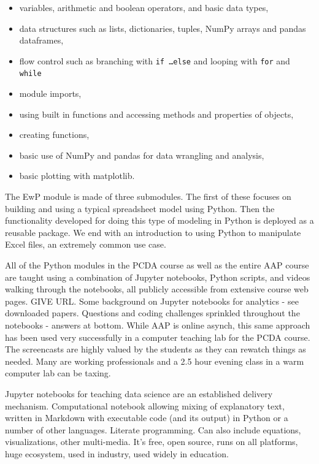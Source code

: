 \documentclass[ited,blindrev]{informs3}              %
\begin{document}
\begin{itemize}
	\item variables, arithmetic and boolean operators, and basic data types,
	\item data structures such as lists, dictionaries, tuples, NumPy arrays and pandas dataframes,
	\item flow control such as branching with \texttt{if \ldots else} and looping with \texttt{for} and \texttt{while}
	\item module imports,
	\item using built in functions and accessing methods and properties of objects,
	\item creating functions,
	\item basic use of NumPy and pandas for data wrangling and analysis,
	\item basic plotting with matplotlib.
\end{itemize}

The EwP module is made of three submodules. The first of these focuses on building and using a typical spreadsheet model using Python. Then the functionality developed for doing this type of modeling in Python is deployed as a reusable package. We end with an introduction to using Python to manipulate Excel files, an extremely common use case.

All of the Python modules in the PCDA course as well as the entire AAP course are taught using a combination of Jupyter notebooks, Python scripts, and videos walking through the notebooks, all publicly accessible from extensive course web pages. GIVE URL. Some background on Jupyter notebooks for analytics - see downloaded papers. Questions and coding challenges sprinkled throughout the notebooks - answers at bottom. While AAP is online asynch, this same approach has been used very successfully in a computer teaching lab for the PCDA course. The screencasts are highly valued by the students as they can rewatch things as needed. Many are working professionals and a 2.5 hour evening class in a warm computer lab can be taxing.

Jupyter notebooks for teaching data science are an established delivery mechanism. Computational notebook allowing mixing of explanatory text, written in Markdown with executable code (and its output) in Python or a number of other languages. Literate programming. Can also include equations, visualizations, other multi-media. It's free, open source, runs on all platforms, huge ecosystem, used in industry, used widely in education.
\end{document}
